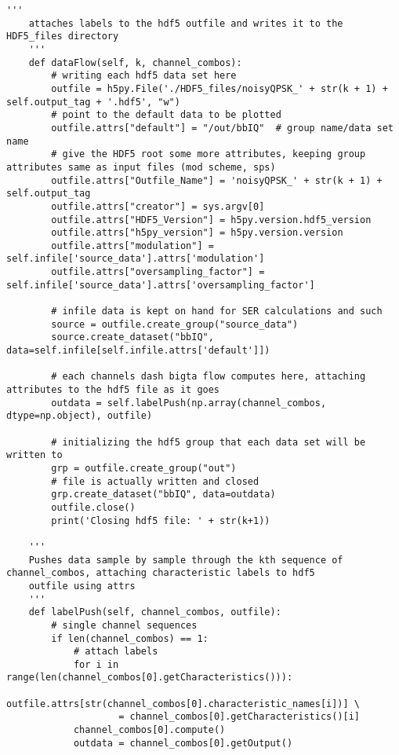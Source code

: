 \begin{lstlisting}[breaklines]
    '''
    attaches labels to the hdf5 outfile and writes it to the HDF5_files directory
    '''
    def dataFlow(self, k, channel_combos):
        # writing each hdf5 data set here
        outfile = h5py.File('./HDF5_files/noisyQPSK_' + str(k + 1) + self.output_tag + '.hdf5', "w")
        # point to the default data to be plotted
        outfile.attrs["default"] = "/out/bbIQ"  # group name/data set name
        # give the HDF5 root some more attributes, keeping group attributes same as input files (mod scheme, sps)
        outfile.attrs["Outfile_Name"] = 'noisyQPSK_' + str(k + 1) + self.output_tag
        outfile.attrs["creator"] = sys.argv[0]
        outfile.attrs["HDF5_Version"] = h5py.version.hdf5_version
        outfile.attrs["h5py_version"] = h5py.version.version
        outfile.attrs["modulation"] = self.infile['source_data'].attrs['modulation']
        outfile.attrs["oversampling_factor"] = self.infile['source_data'].attrs['oversampling_factor']

        # infile data is kept on hand for SER calculations and such
        source = outfile.create_group("source_data")
        source.create_dataset("bbIQ", data=self.infile[self.infile.attrs['default']])

        # each channels dash bigta flow computes here, attaching attributes to the hdf5 file as it goes
        outdata = self.labelPush(np.array(channel_combos, dtype=np.object), outfile)

        # initializing the hdf5 group that each data set will be written to
        grp = outfile.create_group("out")
        # file is actually written and closed
        grp.create_dataset("bbIQ", data=outdata)
        outfile.close()
        print('Closing hdf5 file: ' + str(k+1))

    '''
    Pushes data sample by sample through the kth sequence of channel_combos, attaching characteristic labels to hdf5
    outfile using attrs
    '''
    def labelPush(self, channel_combos, outfile):
        # single channel sequences
        if len(channel_combos) == 1:
            # attach labels
            for i in range(len(channel_combos[0].getCharacteristics())):
                outfile.attrs[str(channel_combos[0].characteristic_names[i])] \
                    = channel_combos[0].getCharacteristics()[i]
            channel_combos[0].compute()
            outdata = channel_combos[0].getOutput()


\end{lstlisting}
